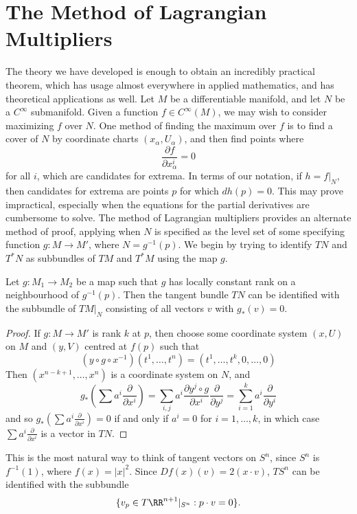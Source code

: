 \section{The Method of Lagrangian Multipliers}

The theory we have developed is enough to obtain an incredibly practical theorem, which has usage almost everywhere in applied mathematics, and has theoretical applications as well. Let $M$ be a differentiable manifold, and let $N$ be a $C^\infty$ submanifold. Given a function $f \in C^\infty(M)$, we may wish to consider maximizing $f$ over $N$. One method of finding the maximum over $f$ is to find a cover of $N$ by coordinate charts $(x_\alpha,U_\alpha)$, and then find points where
%
\[ \frac{\partial f}{\partial x^i_\alpha} = 0 \]
%
for all $i$, which are candidates for extrema. In terms of our notation, if $h = f|_N$, then candidates for extrema are points $p$ for which $dh(p) = 0$. This may prove impractical, especially when the equations for the partial derivatives are cumbersome to solve. The method of Lagrangian multipliers provides an alternate method of proof, applying when $N$ is specified as the level set of some specifying function $g: M \to M'$, where $N = g^{-1}(p)$. We begin by trying to identify $TN$ and $T^*N$ as subbundles of $TM$ and $T^*M$ using the map $g$.

\begin{theorem}
    Let $g: M_1 \to M_2$ be a map such that $g$ has locally constant rank on a neighbourhood of $g^{-1}(p)$. Then the tangent bundle $TN$ can be identified with the subbundle of $TM|_N$ consisting of all vectors $v$ with $g_*(v) = 0$.
\end{theorem}
\begin{proof}
    If $g: M \to M'$ is rank $k$ at $p$, then choose some coordinate system $(x,U)$ on $M$ and $(y,V)$ centred at $f(p)$ such that
    \[ (y \circ g \circ x^{-1})(t^1, \dots, t^n) = (t^1, \dots, t^k, 0, \dots, 0) \]
    Then $(x^{n-k+1}, \dots, x^n)$ is a coordinate system on $N$, and
    \[ g_* \left( \sum a^i \frac{\partial}{\partial x^i} \right) = \sum_{i,j} a^i \frac{\partial y^j \circ g}{\partial x^i} \frac{\partial}{\partial y^j} = \sum_{i = 1}^k a^i \frac{\partial}{\partial y^i} \]
    and so $g_* \left(\sum a^i \frac{\partial}{\partial x^i} \right) = 0$ if and only if $a^i = 0$ for $i = 1, \dots, k$, in which case $\sum a^i \frac{\partial}{\partial x^i}$ is a vector in $TN$.
\end{proof}

\begin{example}
    This is the most natural way to think of tangent vectors on $S^n$, since $S^n$ is $f^{-1}(1)$, where $f(x) = |x|^2$. Since $Df(x)(v) = 2 (x \cdot v)$, $TS^n$ can be identified with the subbundle
    \[ \{ v_p \in T\RR^{n+1}|_{S^n} : p \cdot v = 0  \}. \]
\end{example}

